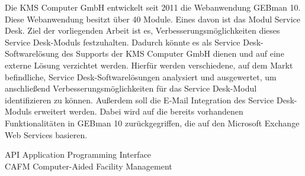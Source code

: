 \documentclass[fontsize=12pt]{scrartcl}
\begin{document}
\noindent
Die KMS Computer GmbH entwickelt seit 2011 die Webanwendung GEBman 10. Diese Webanwendung besitzt über 40 Module. Eines davon ist das Modul Service Desk. Ziel der vorliegenden Arbeit ist es, Verbesserungsmöglichkeiten dieses Service Desk-Moduls festzuhalten. Dadurch könnte es als Service Desk-Softwarelösung des Supports der KMS Computer GmbH dienen und auf eine externe Lösung verzichtet werden. Hierfür werden verschiedene, auf dem Markt befindliche, Service Desk-Softwarelösungen analysiert und ausgewertet, um anschließend Verbesserungsmöglichkeiten für das Service Desk-Modul identifizieren zu können.\newline
Außerdem soll die E-Mail Integration des Service Desk-Moduls erweitert werden. Dabei wird auf die bereits vorhandenen Funktionalitäten in GEBman 10 zurückgegriffen, die auf den Microsoft Exchange Web Services basieren.

\newpage

\vspace*{-1cm}
\setcounter{page}{4}
\tableofcontents
\newpage

\vspace*{-1cm}
\begin{spacing}{1.8}
\listoffigures
\end{spacing}
\newpage


\noindent
API \tabto{4cm} Application Programming Interface\\

\noindent
CAFM \tabto{4cm} Computer-Aided Facility Management\\
\end{document}
